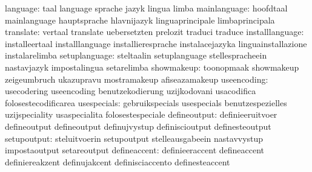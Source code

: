                         language: taal                             language
                                  sprache                          jazyk
                                  lingua                           limba
                    mainlanguage: hoofdtaal                        mainlanguage
                                  hauptsprache                     hlavnijazyk
                                  linguaprincipale                 limbaprincipala
                       translate: vertaal                          translate
                                  uebersetzten                     prelozit
                                  traduci                          traduce
                 installlanguage: installeertaal                   installlanguage
                                  installieresprache               instalacejazyka
                                  linguainstallazione              instalarelimba
                   setuplanguage: steltaalin                       setuplanguage
                                  stellespracheein                 nastavjazyk
                                  impostalingua                    setarelimba
                      showmakeup: toonopmaak                       showmakeup
                                  zeigeumbruch                     ukazupravu
                                  mostramakeup                     afiseazamakeup
                     useencoding: usecodering                      useencoding
                                  benutzekodierung                 uzijkodovani
                                  usacodifica                      folosestecodificarea
                     usespecials: gebruikspecials                  usespecials
                                  benutzespezielles                uzijspeciality
                                  usaspecialita                    folosestespeciale
                    defineoutput: definieeruitvoer                 defineoutput
                                  defineoutput                     definujvystup
                                  definiscioutput                  definesteoutput
                     setupoutput: steluitvoerin                    setupoutput
                                  stelleausgabeein                 nastavvystup
                                  impostaoutput                    setareoutput
                    defineaccent: definieeraccent                  defineaccent
                                  definiereakzent                  definujakcent
                                  definisciaccento                 definesteaccent
